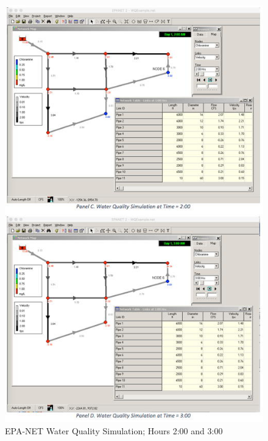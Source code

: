 \documentclass[11pt]{article}
\begin{document}
\begin{enumerate}
\begin{figure}[ht!] %
\centering
   \includegraphics[width=4.5in]{WaterQuality-2.jpg}
     \caption{EPA-NET Water Quality Simulation; Hours 2:00 and 3:00}
   \label{fig:waterQ2} 
\end{figure}


\end{enumerate}
\end{document}
